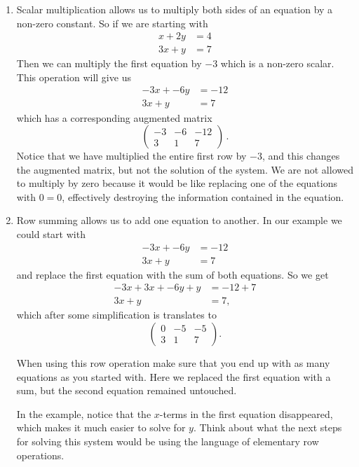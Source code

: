 {\begin{enumerate}
\item Scalar multiplication allows us to multiply both sides of an equation by a non-zero constant.
So if we are starting with
\begin{align*}
 x + 2y &= 4 \\
3x + y &= 7
\end{align*}
Then we can multiply the first equation by $-3$ which is a non-zero scalar. This operation will give us 
 \begin{align*}
 -3x + -6y &= -12 \\
3x + y &= 7
\end{align*}
which has a corresponding augmented matrix
\[
\left( \begin{array}{cc|c}
-3 & -6 & -12 \\
3 & 1 & 7
\end{array} \right)\, .
\]
Notice that we have multiplied the entire first row by $-3$, and this changes the augmented matrix, but not the solution of the system. We are not allowed to multiply by zero because it would be like replacing one of the equations with $0=0$, effectively destroying the information contained in the equation. 

\item Row summing allows us to add one equation to another. In our example we could start with 
\begin{align*}
 -3x + -6y &= -12 \\
3x + y &= 7
\end{align*} 
and replace the first equation with the sum of both equations. So we get 
 \begin{align*}
 -3x + 3x + -6y + y &= -12 + 7 \\
3x + y &= 7,
\end{align*} 
which after some simplification is translates to 
\[
\left( \begin{array}{cc|c}
0 & -5 & -5 \\
3 & 1 & 7
\end{array} \right).
\]

When using this row operation make sure that you end up with as many equations as you started with. Here we replaced the first equation with a sum, but the second equation remained untouched.

In the example, notice that the $x$-terms in the first equation disappeared, which makes it much easier to solve for $y$. Think about what the next steps for solving this system would be using the language of elementary row operations. 

\end{enumerate}


}

\newpage

